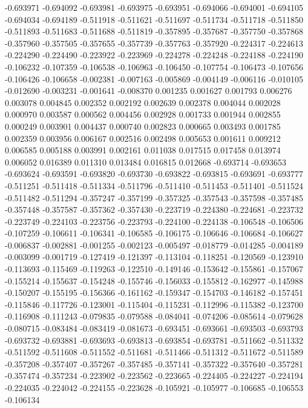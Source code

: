-0.693971
-0.694092
-0.693981
-0.693975
-0.693951
-0.694066
-0.694001
-0.694105
-0.694034
-0.694189
-0.511918
-0.511621
-0.511697
-0.511734
-0.511718
-0.511850
-0.511893
-0.511683
-0.511688
-0.511819
-0.357895
-0.357687
-0.357750
-0.357868
-0.357960
-0.357505
-0.357655
-0.357739
-0.357763
-0.357920
-0.224317
-0.224613
-0.224290
-0.224490
-0.223922
-0.223969
-0.224278
-0.224248
-0.224188
-0.224190
-0.106232
-0.107359
-0.106538
-0.106963
-0.106450
-0.107754
-0.106473
-0.107656
-0.106426
-0.106658
-0.002381
-0.007163
-0.005869
-0.004149
-0.006116
-0.010105
-0.012690
-0.003231
-0.001641
-0.008370
0.001235
0.001627
0.001793
0.006276
0.003078
0.004845
0.002352
0.002192
0.002639
0.002378
0.004044
0.002028
0.000970
0.003587
0.000562
0.004456
0.002928
0.001733
0.001944
0.002855
0.000249
0.003901
0.004437
0.000740
0.002823
0.000665
0.003493
0.001785
0.002359
0.003956
0.006167
0.002516
0.002498
0.005653
0.001611
0.009212
0.006585
0.005188
0.003991
0.002161
0.011038
0.017515
0.017458
0.013974
0.006052
0.016389
0.011310
0.013484
0.016815
0.012668
-0.693714
-0.693653
-0.693624
-0.693591
-0.693820
-0.693730
-0.693822
-0.693815
-0.693691
-0.693777
-0.511251
-0.511418
-0.511334
-0.511796
-0.511410
-0.511453
-0.511401
-0.511524
-0.511482
-0.511294
-0.357247
-0.357199
-0.357325
-0.357543
-0.357598
-0.357485
-0.357448
-0.357587
-0.357362
-0.357430
-0.223719
-0.224380
-0.224681
-0.223732
-0.223749
-0.224103
-0.223756
-0.223793
-0.224100
-0.224138
-0.106548
-0.106506
-0.107259
-0.106611
-0.106341
-0.106585
-0.106175
-0.106646
-0.106684
-0.106627
-0.006837
-0.002881
-0.001255
-0.002123
-0.005497
-0.018779
-0.014285
-0.004189
-0.003099
-0.001719
-0.127419
-0.121397
-0.113104
-0.118251
-0.120569
-0.123910
-0.113693
-0.115469
-0.119263
-0.122510
-0.149146
-0.153642
-0.155861
-0.157067
-0.155214
-0.155637
-0.154248
-0.155746
-0.156033
-0.155812
-0.162977
-0.145988
-0.150207
-0.155195
-0.156366
-0.161162
-0.159347
-0.154703
-0.146182
-0.157451
-0.115846
-0.117726
-0.123001
-0.115404
-0.115231
-0.112996
-0.115382
-0.123700
-0.116908
-0.111243
-0.079835
-0.079588
-0.084041
-0.074206
-0.085614
-0.079628
-0.080715
-0.083484
-0.083419
-0.081673
-0.693451
-0.693661
-0.693503
-0.693793
-0.693732
-0.693881
-0.693693
-0.693813
-0.693854
-0.693781
-0.511662
-0.511332
-0.511592
-0.511608
-0.511552
-0.511681
-0.511466
-0.511312
-0.511672
-0.511589
-0.357208
-0.357407
-0.357267
-0.357485
-0.357141
-0.357322
-0.357640
-0.357281
-0.357474
-0.357234
-0.223902
-0.223562
-0.223665
-0.224405
-0.224227
-0.224194
-0.224035
-0.224042
-0.224155
-0.223628
-0.105921
-0.105977
-0.106685
-0.106553
-0.106134
